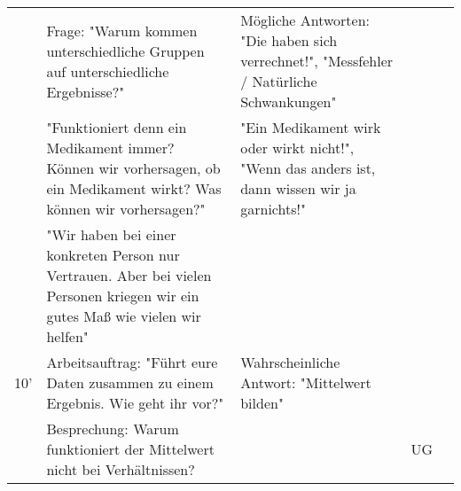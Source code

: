 \documentclass{article}
\begin{document}
\begin{tabularx}{\textwidth}{|X|X|X|X|X|}
                              & Frage: "Warum kommen unterschiedliche Gruppen auf unterschiedliche Ergebnisse?"                                                                                                                                                   & Mögliche Antworten: "Die haben sich verrechnet!", "Messfehler / Natürliche Schwankungen"                                    &                                                                                          &                                                                             \\
                              & "Funktioniert denn ein Medikament immer? Können wir vorhersagen, ob ein Medikament wirkt? Was können wir vorhersagen?"                                                                                                            & "Ein Medikament wirk oder wirkt nicht!", "Wenn das anders ist, dann wissen wir ja garnichts!"                               &                                                                                          &                                                                             \\
                              & "Wir haben bei einer konkreten Person nur Vertrauen. Aber bei vielen Personen kriegen wir ein gutes Maß wie vielen wir helfen"                                                                                                    &                                                                                                                             &                                                                                          &                                                                             \\
10'                           & Arbeitsauftrag: "Führt eure Daten zusammen zu einem Ergebnis. Wie geht ihr vor?"                                                                                                                                                  & Wahrscheinliche Antwort: "Mittelwert bilden"                                                                                &                                                                                          &                                                                             \\
                              & Besprechung: Warum funktioniert der Mittelwert nicht bei Verhältnissen?                                                                                                                                                           &                                                                                                                             & UG                                                                                       &                                                                             \\

\end{tabularx}
\end{document}
